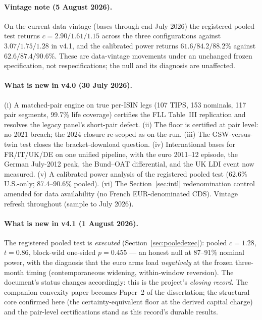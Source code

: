 \documentclass[11pt]{article}
\begin{document}
\paragraph{Vintage note (5 August 2026).} On the current data vintage (bases through end-July
2026) the registered pooled test returns $c=2.90/1.61/1.15$ across the three configurations
against $3.07/1.75/1.28$ in v4.1, and the calibrated power returns $61.6/84.2/88.2\%$ against
$62.6/87.4/90.6\%$. These are data-vintage movements under an unchanged frozen specification, not
respecifications; the null and its diagnosis are unaffected.

\paragraph{What is new in v4.0 (30 July 2026).} (i) A matched-pair engine on true per-ISIN legs (107 TIPS, 153 nominals, 117 pair segments, 99.7\% life coverage) certifies the FLL Table~III replication and resolves the legacy panel's short-pair defect. (ii) The floor is certified at pair level: no 2021 breach; the 2024 closure re-scoped as on-the-run. (iii) The GSW-versus-twin test closes the bracket-download question. (iv) International bases for FR/IT/UK/DE on one unified pipeline, with the euro 2011--12 episode, the German July-2012 peak, the Bund--OAT differential, and the UK LDI event now measured. (v) A calibrated power analysis of the registered pooled test (62.6\% U.S.-only; 87.4--90.6\% pooled). (vi) The Section~\ref{sec:intl} redenomination control amended for data availability (no French EUR-denominated CDS). Vintage refresh throughout (sample to July 2026).

\paragraph{What is new in v4.1 (1 August 2026).} The registered pooled test is \emph{executed} (Section~\ref{sec:pooledexec}): pooled $c=1.28$, $t=0.86$, block-wild one-sided $p=0.455$ --- an honest null at 87--91\% nominal power, with the diagnosis that the euro arms load \emph{negatively} at the frozen three-month timing (contemporaneous widening, within-window reversion). The document's status changes accordingly: this is the project's \emph{closing record}. The companion convexity paper becomes Paper~2 of the dissertation; the structural core confirmed here (the certainty-equivalent floor at the derived capital charge) and the pair-level certifications stand as this record's durable results.
\end{document}

